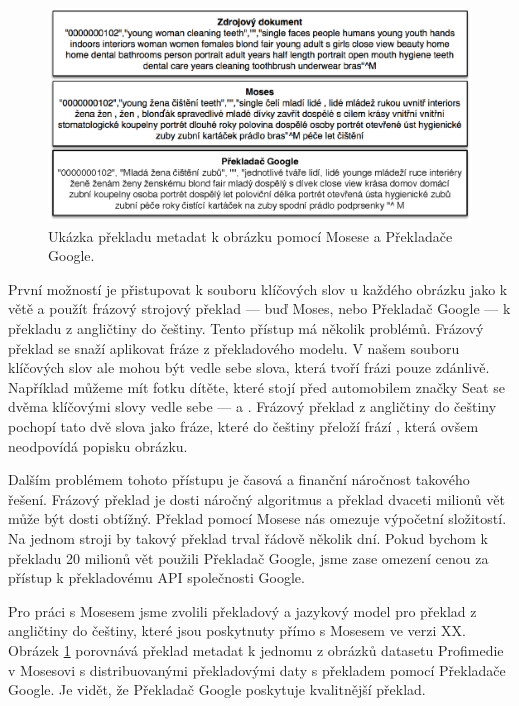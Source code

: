\begin{figure}[h]
  \centering
  \includegraphics[width=150mm]{translate.eps}
  \caption{Ukázka překladu metadat k obrázku pomocí Mosese a Překladače Google.}
  \label{fig:translate}
\end{figure}

První možností je přistupovat k souboru klíčových slov u každého obrázku jako k větě a použít frázový strojový překlad --- buď Moses, nebo Překladač Google\cite{googletranslate} --- k překladu z angličtiny do češtiny. Tento přístup má několik problémů. Frázový překlad se snaží aplikovat fráze z překladového modelu. V našem souboru klíčových slov ale mohou být vedle sebe slova, která tvoří frázi pouze zdánlivě. Například můžeme mít fotku dítěte, které stojí před automobilem značky Seat se dvěma klíčovými slovy vedle sebe ---  a . Frázový překlad z angličtiny do češtiny pochopí tato dvě slova jako fráze, které do češtiny přeloží frází , která ovšem neodpovídá popisku obrázku.

Dalším problémem tohoto přístupu je časová a finanční náročnost takového řešení. Frázový překlad je dosti náročný algoritmus a překlad dvaceti milionů vět může být dosti obtížný. Překlad pomocí Mosese nás omezuje výpočetní složitostí. Na jednom stroji by takový překlad trval řádově několik dní. Pokud bychom k překladu 20 milionů vět použili Překladač Google, jsme zase omezení cenou za přístup k překladovému API společnosti Google.

Pro práci s Mosesem jsme zvolili překladový a jazykový model pro překlad z angličtiny do češtiny, které jsou poskytnuty přímo s Mosesem ve verzi XX. Obrázek \ref{fig:translate} porovnává překlad metadat k jednomu z obrázků datasetu Profimedie v Mosesovi s distribuovanými překladovými daty s překladem pomocí Překladače Google. Je vidět, že Překladač Google poskytuje kvalitnější překlad. 

